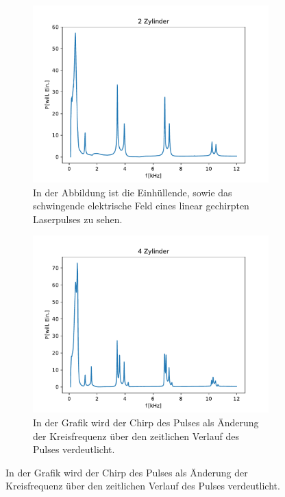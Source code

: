             \FloatBarrier
            \begin{figure}[ht]
                \centering
                \begin{subfigure}[b]{0.45\textwidth}
                    \centering
                    \includegraphics[scale=0.45]{./pictures/1dim_2_Zylinder_16mm.pdf}
                    \caption{In der Abbildung ist die Einhüllende, sowie das schwingende elektrische Feld eines linear gechirpten Laserpulses zu sehen.}
                    \label{fig:1dim_2_Zylinder_16mm}
                \end{subfigure}
                \hfill
                \centering
                \begin{subfigure}[b]{0.45\textwidth}
                    \centering
                    \includegraphics[scale=0.45]{./pictures/1dim_4_Zylinder_16mm.pdf}
                    \caption{In der Grafik wird der Chirp des Pulses als Änderung der Kreisfrequenz über den zeitlichen Verlauf des Pulses verdeutlicht.}
                    \label{fig:1dim_4_Zylinder_16mm}
                \end{subfigure}


\end{figure}
